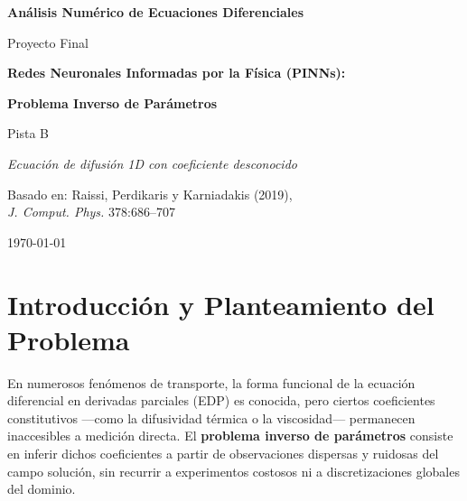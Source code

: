 \documentclass[12pt,a4paper]{article}
\begin{document}
\begin{titlepage}
  \centering
  \vspace*{2cm}
  {\Large \textbf{Análisis Numérico de Ecuaciones Diferenciales} \par}
  \vspace{0.5cm}
  {\large Proyecto Final \par}
  \vspace{2cm}
  {\LARGE \textbf{Redes Neuronales Informadas por la Física (PINNs):} \par}
  \vspace{0.4cm}
  {\LARGE \textbf{Problema Inverso de Parámetros} \par}
  \vspace{0.5cm}
  {\large Pista B \par}
  \vspace{3cm}
  {\large \textit{Ecuación de difusión 1D con coeficiente desconocido} \par}
  \vspace{3cm}
  {\normalsize Basado en: Raissi, Perdikaris y Karniadakis (2019),\\
  \textit{J. Comput. Phys.} 378:686--707 \par}
  \vfill
  {\normalsize \today \par}
\end{titlepage}

\tableofcontents
\newpage

\section{Introducción y Planteamiento del Problema}

En numerosos fenómenos de transporte, la forma funcional de la ecuación diferencial en
derivadas parciales (EDP) es conocida, pero ciertos coeficientes constitutivos ---como la
difusividad térmica o la viscosidad--- permanecen inaccesibles a medición directa. El
\textbf{problema inverso de parámetros} consiste en inferir dichos coeficientes a partir de
observaciones dispersas y ruidosas del campo solución, sin recurrir a experimentos costosos
ni a discretizaciones globales del dominio.
\end{document}
